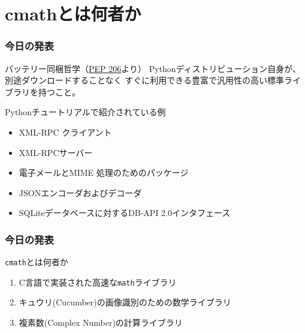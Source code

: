 \documentclass[dvipdfmx,11pt,notheorems]{beamer}
\theoremstyle{definition}
\begin{document}
\section{cmathとは何者か}

\begin{frame}\frametitle{今日の発表}

\begin{block}{バッテリー同梱哲学（\href{https://www.python.org/dev/peps/pep-0206/}{PEP 206}より）}
Pythonディストリビューション自身が、別途ダウンロードすることなく
すぐに利用できる豊富で汎用性の高い標準ライブラリを持つこと。
\end{block}

\begin{exampleblock}{Pythonチュートリアルで紹介されている例}
\begin{itemize}
\item {} XML-RPC クライアント
\item {} XML-RPCサーバー
\item {} 電子メールとMIME 処理のためのパッケージ
\item {} JSONエンコーダおよびデコーダ
\item {} SQLiteデータベースに対するDB-API 2.0インタフェース
\end{itemize}
\end{exampleblock}

\end{frame}

\begin{frame}\frametitle{今日の発表}

\begin{exampleblock}{\texttt{cmath}とは何者か}
\begin{enumerate}
\item C言語で実装された高速な\texttt{math}ライブラリ
\item キュウリ(Cucumber)の画像識別のための数学ライブラリ
\item 複素数(Complex Number)の計算ライブラリ
\end{enumerate}

\end{exampleblock}

\end{frame}
\end{document}
